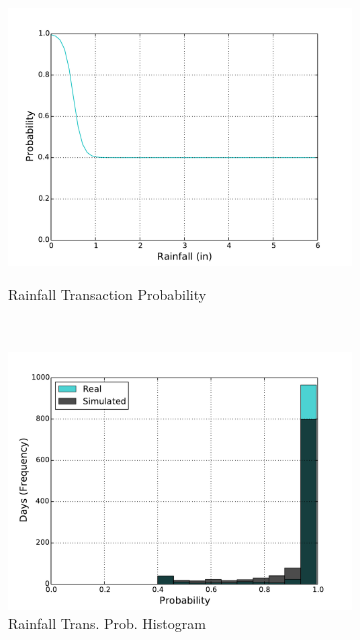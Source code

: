 \documentclass[11pt, letterpaper]{article}
\begin{document}
\begin{figure}[H]
\begin{subfigure}[b]{0.45\textwidth}
    \includegraphics[width=\textwidth]{figures/rainfall_trans_prob.pdf}
    \label{fig:analysis-raw}
    \caption{Rainfall Transaction Probability}
  \end{subfigure}
  ~
  \begin{subfigure}[b]{0.45\textwidth}
    \includegraphics[width=\textwidth]{figures/rainfall_trans_prob_hist.pdf}
    \caption{Rainfall Trans. Prob. Histogram}
  \end{subfigure}
  \label{fig:analysis}
  \caption{}
\end{figure}
\end{document}
